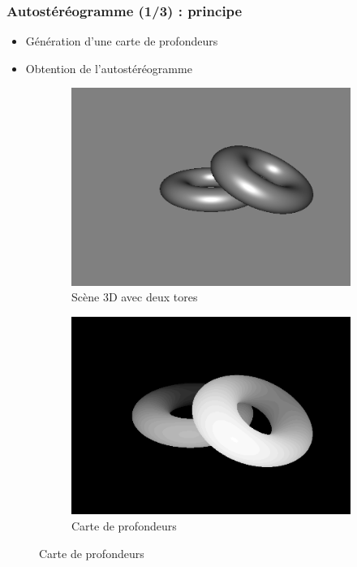 \documentclass{beamer}
\begin{document}
\begin{frame}
\frametitle{Autostéréogramme (1/3) : principe}

\begin{itemize}[label=$\bullet$]
\item Génération d'une carte de profondeurs
\item Obtention de l'autostéréogramme
\end{itemize}
\begin{figure}
\caption{Du rendu de la scène 3D à la carte de profondeurs}
\begin{subfigure}{.4\textwidth}
  \centering
  \includegraphics[width=1\linewidth]{rendu_donuts.png}
  \caption{Scène 3D avec deux tores}
\end{subfigure}
\begin{subfigure}{.4\textwidth}
  \centering
  \includegraphics[width=1\linewidth]{donutdepth.png}
  \caption{Carte de profondeurs}
\end{subfigure}
\end{figure}
\end{frame}
\end{document}
